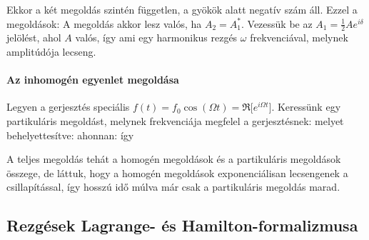 \begin{itemize}
      Ekkor a két megoldás szintén független, a gyökök alatt negatív szám áll.
   Ezzel a megoldások:
      A megoldás akkor lesz valós, ha $A_2=A_1^*$.
   Vezessük be az $A_1=\frac{1}{2}Ae^{i\delta}$ jelölést, ahol $A$ valós, így
      ami egy harmonikus rezgés $\omega$ frekvenciával, melynek amplitúdója lecseng. 
    \end{itemize}
    
   \paragraph{Az inhomogén egyenlet megoldása}
    
    Legyen a gerjesztés speciális $f(t)=f_0\cos(\Omega t)=\Re\big[e^{i\Omega t} \big]$.
   Keressünk egy partikuláris megoldást, melynek frekvenciája megfelel a gerjesztésnek:
    melyet behelyettesítve:
    ahonnan:
    így
    
    A teljes megoldás tehát a homogén megoldások és a partikuláris megoldások összege, de láttuk, hogy a homogén megoldások exponenciálisan lecsengenek a csillapítással, így hosszú idő múlva már csak a partikuláris megoldás marad. 
    
  \subsection{Rezgések Lagrange- és Hamilton-formalizmusa}
   
